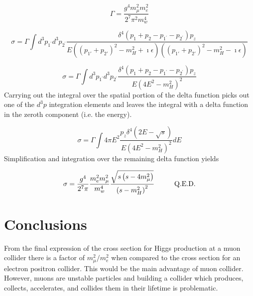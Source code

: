 \documentclass{article}
\begin{document}
\begin{equation}
\Gamma=\frac{g^4m_\mu^2m_e^2}{2^7\pi^2m_w^4}
\end{equation}

\begin{equation}
\sigma=\Gamma\int d^3p_{1^{'}}d^3p_{2^{'}}\frac{\delta^4\left(p_1+p_2-p_{1^{'}}-p_{2^{'}}\right)p_z}{E\left(\left(p_{1'}+p_{2'}\right)^2-m_H^2+\imath\epsilon\right)\left(\left(p_{1'}+p_{2'}\right)^2-m_H^2-\imath\epsilon\right)}
\end{equation}

\begin{equation}
\sigma=\Gamma\int d^3p_{1^{'}}d^3p_{2^{'}}\frac{\delta^4\left(p_1+p_2-p_{1^{'}}-p_{2^{'}}\right)p_z}{E\left(4E^2-m_H^2\right)^2}
\end{equation}
Carrying out the integral over the spatial portion of the delta function picks out one of the $d^3p$ integration elements and leaves the integral with a delta function in the zeroth component (i.e. the energy).

\begin{equation}
\sigma=\Gamma\int 4\pi E^2\frac{p_z\delta^4\left(2E-\sqrt{s}\right)}{E\left(4E^2-m_H^2\right)^2}dE
\end{equation}
Simplification and integration over the remaining delta function yields

\begin{equation}
\sigma=\frac{g^4}{2^7\pi}\frac{m_e^2m_\mu^2}{m_w^4}\frac{\sqrt{s\left(s-4m_\mu^2\right)}}{\left(s-m_H^2\right)^2}\text{\hspace{1cm}Q.E.D.}
\end{equation}

\section{Conclusions}
From the final expression of the cross section for Higgs production at a muon collider there is a factor of $m_\mu^2/m_e^2$ when compared to the cross section for an electron positron collider.  This would be the main advantage of muon collider.  However, muons are unstable particles and building a collider which produces, collects, accelerates, and collides them in their lifetime is problematic.  
\end{document}
